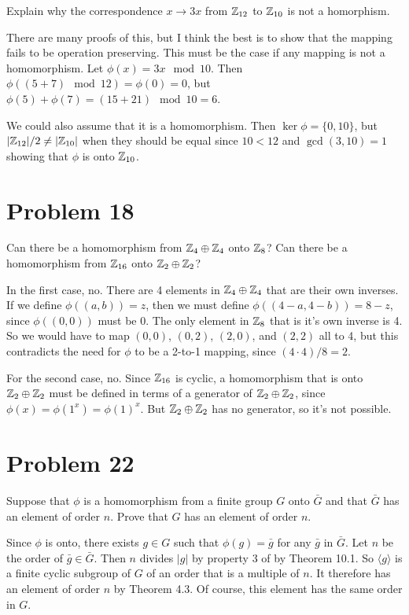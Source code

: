 \documentclass{article}
\begin{document}
Explain why the correspondence $x\to 3x$ from $\mathbb{Z}_{12}$ to $\mathbb{Z}_{10}$ is not a homorphism.

There are many proofs of this, but I think the best is to show that the mapping fails to
be operation preserving.  This must be the case if any mapping is not a homomorphism.
Let $\phi(x)=3x\mod 10$.  Then $\phi((5+7)\mod 12)=\phi(0)=0$, but
$\phi(5)+\phi(7)=(15+21)\mod 10=6$.

We could also assume that it is a homomorphism.  Then $\ker\phi=\{0,10\}$, but $|\mathbb{Z}_{12}|/2\neq|\mathbb{Z}_{10}|$ when
they should be equal since $10<12$ and $\gcd(3,10)=1$ showing that $\phi$ is onto $\mathbb{Z}_{10}$.

\section*{Problem 18}

Can there be a homomorphism from $\mathbb{Z}_4\oplus \mathbb{Z}_4$ onto $\mathbb{Z}_8$?
Can there be a homomorphism from $\mathbb{Z}_{16}$ onto $\mathbb{Z}_2\oplus\mathbb{Z}_2$?

In the first case, no.  There are 4 elements in $\mathbb{Z}_4\oplus \mathbb{Z}_4$ that are their
own inverses.  If we define $\phi((a,b))=z$, then we must define $\phi((4-a,4-b))=8-z$,
since $\phi((0,0))$ must be 0.  The only element in $\mathbb{Z}_8$ that is it's own inverse
is 4.  So we would have to map $(0,0)$, $(0,2)$, $(2,0)$, and $(2,2)$ all to 4,
but this contradicts the need for $\phi$ to be a 2-to-1 mapping, since $(4\cdot 4)/8=2$.

For the second case, no.  Since $\mathbb{Z}_{16}$ is cyclic, a homomorphism that is onto $\mathbb{Z}_2\oplus\mathbb{Z}_2$ must
be defined in terms of a generator of $\mathbb{Z}_2\oplus\mathbb{Z}_2$, since $\phi(x)=\phi(1^x)=\phi(1)^x$.
But $\mathbb{Z}_2\oplus\mathbb{Z}_2$ has no generator, so it's not possible.

\section*{Problem 22}

Suppose that $\phi$ is a homomorphism from a finite group $G$ onto $\bar{G}$ and
that $\bar{G}$ has an element of order $n$.  Prove that $G$ has an element of
order $n$.

Since $\phi$ is onto, there exists $g\in G$ such that $\phi(g)=\bar{g}$
for any $\bar{g}$ in $\bar{G}$.  Let $n$ be the order of $\bar{g}\in\bar{G}$.
Then $n$ divides $|g|$ by property 3 of by Theorem 10.1.
So $\langle g\rangle$ is a finite cyclic subgroup of $G$ of an order that is a multiple of $n$.
It therefore has an element of order $n$ by Theorem 4.3.  Of course, this element has the same
order in $G$.
\end{document}
